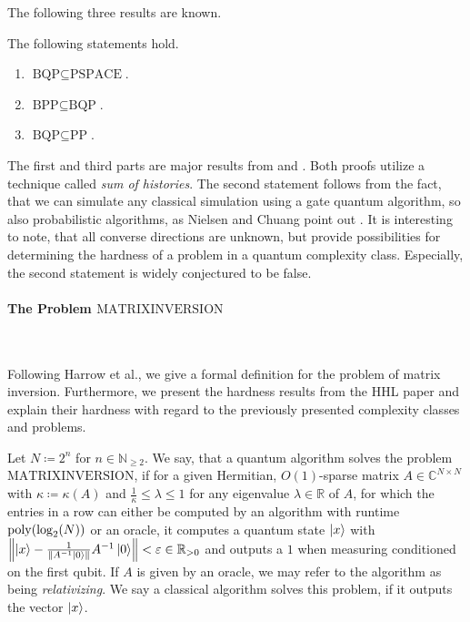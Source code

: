 \phantom{}

The following three results are known.

\begin{theorem} \label{bqp_relations}
    The following statements hold.
    \begin{enumerate}[label=(\roman*)]
        \item \label{bqp_in_pspace} \(\text{BQP} \subseteq \text{PSPACE}\).
        \item \label{bpp_in_bqp} \(\text{BPP} \subseteq \text{BQP}\).
        \item \label{bqp_in_pp} \(\text{BQP} \subseteq \text{PP}\).
    \end{enumerate}
\end{theorem}


The first and third parts are major results from \cite[p. 201]{Nielsen2010} and \cite[p. 1538]{Adleman_1997}. Both proofs utilize a technique called \emph{sum of histories}. The second statement follows from the fact, that we can simulate any classical simulation using a gate quantum algorithm, so also probabilistic algorithms, as Nielsen and Chuang point out \cite[p. 201]{Nielsen2010}. It is interesting to note, that all converse directions are unknown, but provide possibilities for determining the hardness of a problem in a quantum complexity class. Especially, the second statement is widely conjectured to be false.

\paragraph*{The Problem \(\text{MATRIXINVERSION}\)} \phantom{}\\\phantom{}

Following Harrow et al., we give a formal definition for the problem of matrix inversion. Furthermore, we present the hardness results from the HHL paper and explain their hardness with regard to the previously presented complexity classes and problems.

\begin{definition}
    Let \(N \coloneqq 2^n\) for \(n \in \mathbb{N}_{\geq 2}\). We say, that a quantum algorithm solves the problem \(\text{MATRIXINVERSION}\), if for a given Hermitian, \(O(1)\)-sparse matrix \(A \in \mathbb{C}^{N \times N}\) with \(\kappa \coloneqq \kappa(A)\) and \(\frac{1}{\kappa} \leq \lambda \leq 1\) for any eigenvalue \(\lambda \in \mathbb{R}\) of \(A\), for which the entries in a row can either be computed by an algorithm with runtime \(\operatorname{poly}(\log_2(N))\) or an oracle, it computes a quantum state \(\ket{x}\) with \(\norm{\ket{x} - \frac{1}{\norm{A^{-1}\ket{0}}} A^{-1}\ket{0}} < \varepsilon \in \mathbb{R}_{> 0}\) and outputs a \(1\) when measuring conditioned on the first qubit. If \(A\) is given by an oracle, we may refer to the algorithm as being \emph{relativizing}. We say a classical algorithm solves this problem, if it outputs the vector \(\ket{x}\).
\end{definition}

